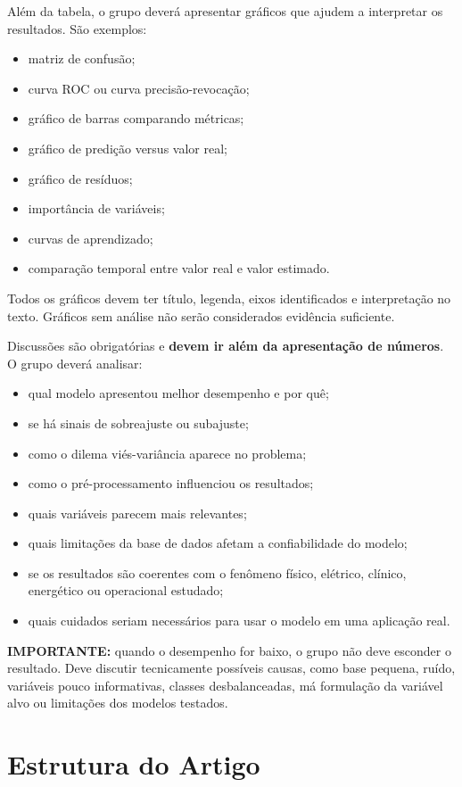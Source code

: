 \documentclass[a4paper]{ifacconf}
\begin{document}
Além da tabela, o grupo deverá apresentar gráficos que ajudem a interpretar os resultados. São exemplos:
\begin{itemize}
    \item matriz de confusão;
    \item curva ROC ou curva precisão-revocação;
    \item gráfico de barras comparando métricas;
    \item gráfico de predição versus valor real;
    \item gráfico de resíduos;
    \item importância de variáveis;
    \item curvas de aprendizado;
    \item comparação temporal entre valor real e valor estimado.
\end{itemize}

Todos os gráficos devem ter título, legenda, eixos identificados e interpretação no texto. Gráficos sem análise não serão considerados evidência suficiente.

Discussões são obrigatórias e \textbf{devem ir além da apresentação de números}. O grupo deverá analisar:
\begin{itemize}
    \item qual modelo apresentou melhor desempenho e por quê;
    \item se há sinais de sobreajuste ou subajuste;
    \item como o dilema viés-variância aparece no problema;
    \item como o pré-processamento influenciou os resultados;
    \item quais variáveis parecem mais relevantes;
    \item quais limitações da base de dados afetam a confiabilidade do modelo;
    \item se os resultados são coerentes com o fenômeno físico, elétrico, clínico, energético ou operacional estudado;
    \item quais cuidados seriam necessários para usar o modelo em uma aplicação real.
\end{itemize}

\textbf{IMPORTANTE:} quando o desempenho for baixo, o grupo não deve esconder o resultado. Deve discutir tecnicamente possíveis causas, como base pequena, ruído, variáveis pouco informativas, classes desbalanceadas, má formulação da variável alvo ou limitações dos modelos testados.

\section{Estrutura do Artigo}
\end{document}
